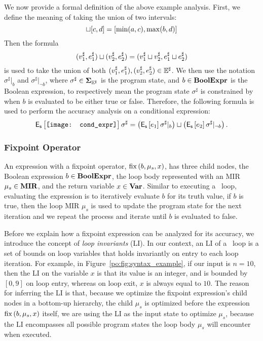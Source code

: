We now provide a formal definition of the above example analysis.  First, we
define the meaning of taking the union of two intervals:
\begin{equation}
    [a, b] \join [c, d] = [\min(a, c), \max(b, d)]
\end{equation}
Then the formula
\begin{equation}
    (v^\sharp_1, e^\sharp_1) \sqcup (v^\sharp_2, e^\sharp_2) =
    (v^\sharp_1 \sqcup v^\sharp_2, e^\sharp_1 \sqcup e^\sharp_2) 
\end{equation}
is used to take the union of both $(v^\sharp_1, e^\sharp_1), (v^\sharp_2,
e^\sharp_2) \in \mathbb{E}^\sharp$.  We then use the notation $\sigma^\sharp|_b$ and
$\sigma^\sharp|_{\neg b}$, where $\sigma^\sharp \in \mathbf{\Sigma}_{\mathbb{E}^\sharp}$ is the program
state, and $b \in \mathbf{BoolExpr}$ is the Boolean expression, to respectively mean
the program state $\sigma^\sharp$ is constrained by when $b$ is evaluated to be
either true or false.  Therefore, the following formula is used to perform the
accuracy analysis on a conditional expression:
\begin{equation}
    \exprerrorfunc{%
        \begin{aligned}
            \texttt{[image: cond\_expr]}
            \vspace{-5pt}
        \end{aligned}
    }{\sigma^\sharp}
    =
    \left(\exprerrorfunc{e_1}{\sigma^\sharp|_b}\right) \join
    \left(\exprerrorfunc{e_2}{\sigma^\sharp|_{\neg b}}\right).
\end{equation}

\subsubsection{Fixpoint Operator}

An expression with a fixpoint operator, $\operatorname{\mathrm{fix}}\left({b, \mu_s, x}\right)$, has
three child nodes, the Boolean expression $b \in \mathbf{BoolExpr}$, the loop body
represented with an MIR $\mu_s \in \mathbf{MIR}$, and the return variable $x \in
\mathbf{Var}$.  Similar to executing a \whilelit~loop, evaluating the expression is
to iteratively evaluate $b$ for its truth value, if $b$ is true, then the loop
MIR $\mu_s$ is used to update the program state for the next iteration and we
repeat the process and iterate until $b$ is evaluated to false.

Before we explain how a fixpoint expression can be analyzed for its
accuracy, we introduce the concept of \emph{loop invariants} (LI).  In our
context, an LI of a \whilelit~loop is a set of bounds on loop variables
that holds invariantly on entry to each loop iteration.  For example, in
Figure~\ref{po:fig:syntax_example}, if our input is $n = 10$, then the LI on
the variable $x$ is that its value is an integer, and is bounded by $[0, 9]$
on loop entry, whereas on loop exit, $x$ is always equal to $10$.  The reason
for inferring the LI is that, because we optimize the fixpoint expression's
child nodes in a bottom-up hierarchy, the child $\mu_s$ is optimized before the
expression $\operatorname{\mathrm{fix}}\left({b, \mu_s, x}\right)$ itself, we are using the LI as the input
state to optimize $\mu_s$, because the LI encompasses all possible program
states the loop body $\mu_s$ will encounter when executed.

